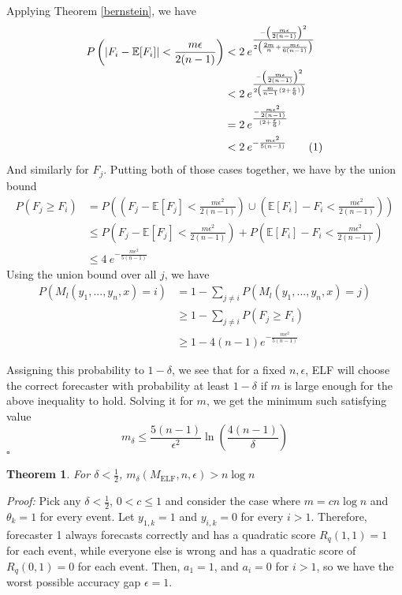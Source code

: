 \documentclass[letterpaper,12pt]{article}
\newcommand{\E}{\mathbb{E}}
\newcommand{\1}{\mathbbm{1}}
\newcommand*{\QED}{\hfill\ensuremath{\square}}%
\newcommand{\elf}{M_{\mathrm{ELF}}}
\newcommand\numberthis{\addtocounter{equation}{1}\tag{\theequation}}
\newtheorem{theorem}{Theorem}
\begin{document}
Applying Theorem \ref{bernstein}, we have
\begin{align*}
    P\left(\left| F_i - \E[F_i]\right| < \frac{m \epsilon}{2(n - 1)} \right) 
    &< 2 \: e^{\frac{-\left(\frac{m \epsilon}{2(n - 1)}\right)^2 }{2\left(\frac{2m}{n} + \frac{m \epsilon}{6(n - 1)}\right)}} \\
    &< 2 \: e^{\frac{-\left(\frac{m \epsilon}{2(n - 1)}\right)^2 }{2\left(\frac{m}{n-1}(2 + \frac{\epsilon}{6}) \right)}} \\
    &= 2 \: e^{\frac{-\frac{m \epsilon^2}{2(n - 1)} }{(2 + \frac{\epsilon}{6})}} \\
    &< 2 \: e^{-\frac{m \epsilon^2}{5(n - 1)} }  \numberthis \label{elf_bernstein} 
\end{align*}
And similarly for $F_j$. Putting both of those cases together, we have by the union bound
\begin{align*}
  P(F_j \geq F_i) &= P\left(\left(F_j - \E[F_j] < \frac{m \epsilon^2}{2(n - 1)}\right) \cup \left(\E[F_i] - F_i < \frac{m \epsilon^2}{2(n - 1)} \right) \right) \\
  &\leq P\left(F_j - \E[F_j] < \frac{m \epsilon^2}{2(n - 1)}\right) + P\left(\E[F_i] - F_i < \frac{m \epsilon^2}{2(n - 1)} \right) \\
  &\leq 4 \: e^{-\frac{m \epsilon^2}{5(n - 1)} }
\end{align*}
Using the union bound over all $j$, we have
\begin{align*}
  P\left(M_l(y_1, ..., y_n, x) = i\right)
  &= 1 - \sum_{j\neq i} P\left(M_l(y_1, ..., y_n, x) = j\right) \\
  &\geq 1 - \sum_{j\neq i} P\left(F_j \geq F_i\right) \\
  &\geq 1 - 4 (n-1) e^{-\frac{m \epsilon^2}{5(n - 1)}} 
\end{align*}

Assigning this probability to $1 - \delta$, we see that for a fixed $n, \epsilon$, ELF will choose the correct forecaster with probability at least $1 - \delta$ if $m$ is large enough for the above inequality to hold. Solving it for $m$, we get the minimum such satisfying value
\[m_\delta \leq \frac{5(n-1)}{\epsilon^2}\ln\left(\frac{4(n-1)}{\delta}\right) \]
\hfill\QED

\begin{theorem}
  \label{elf_lower_bound}
    For $\delta < \frac{1}{2}$, $m_\delta(\elf, n, \epsilon) > n \log n$
\end{theorem}
\emph{Proof:} Pick any $\delta < \frac{1}{2}$, $0 < c \leq 1$ and consider the case where $m = c n \log n$ and $\theta_k = 1$ for every event. Let $y_{1, k} = 1$ and $y_{i, k} = 0$ for every $i > 1$. Therefore, forecaster 1 always forecasts correctly and has a quadratic score $R_q(1, 1) = 1$ for each event, while everyone else is wrong and has a quadratic score of $R_q(0, 1) = 0$ for each event. Then, $a_1 = 1$, and $a_i = 0$ for $i > 1$, so we have the worst possible accuracy gap $\epsilon = 1$.
\end{document}
